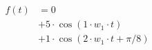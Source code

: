 \begin{center}
\begin{align*}
f(t) &= 0 \\
&+ 5 \cdot \cos( 1 \cdot w_1 \cdot t) \\
&+ 1 \cdot \cos( 2 \cdot w_1 \cdot t + \pi/8)
\end{align*}
\end{center}
